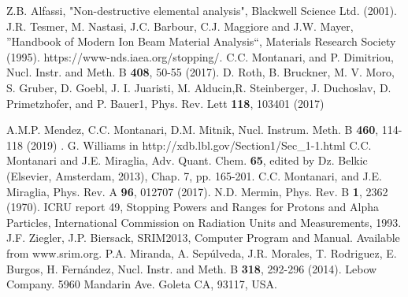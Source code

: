 \documentclass[aps,prb,reprint,groupedaddress]{revtex4-1}
\begin{document}
\begin{thebibliography}{00}
 Z.B. Alfassi, "Non-destructive elemental analysis", Blackwell Science Ltd. (2001).
 J.R. Tesmer, M. Nastasi, J.C. Barbour, C.J. Maggiore and J.W. Mayer, ''Handbook of Modern Ion Beam Material Analysis``, Materials Research Society (1995).
 https://www-nds.iaea.org/stopping/.
 C.C. Montanari, and P. Dimitriou, Nucl. Instr. and Meth. B \textbf{408},  50-55 (2017).
 D. Roth, B. Bruckner, M. V. Moro, S. Gruber, D. Goebl, J. I. Juaristi, M. Alducin,R. Steinberger, J. Duchoslav, D. Primetzhofer, and P. Bauer1, Phys. Rev. Lett \textbf{118}, 103401 (2017)


 A.M.P. Mendez, C.C. Montanari, D.M. Mitnik, %
Nucl. Instrum. Meth. B \textbf{460}, 114-118 (2019) .
G. Williams in http://xdb.lbl.gov/Section1/Sec\_1-1.html
 C.C. Montanari and J.E. Miraglia, Adv. Quant. Chem. \textbf{65}, edited by Dz. Belkic (Elsevier, Amsterdam, 2013), Chap. 7, pp. 165-201.
 C.C. Montanari, and J.E. Miraglia, Phys. Rev. A \textbf{96}, 012707 (2017).
 N.D. Mermin, Phys. Rev. B \textbf{1}, 2362 (1970).
 ICRU report 49, Stopping Powers and Ranges for Protons and Alpha Particles, International Commission on
Radiation Units and Measurements, 1993.
 J.F. Ziegler, J.P. Biersack, SRIM2013, Computer Program and Manual. Available from www.srim.org.
 P.A. Miranda, A. Sep\'ulveda, J.R. Morales, T. Rodriguez, E. Burgos, H. Fern\'andez, Nucl. Instr. and Meth. B \textbf{318}, 292-296  (2014).
 Lebow Company. 5960 Mandarin Ave. Goleta CA, 93117, USA.


\end{thebibliography}
\end{document}
